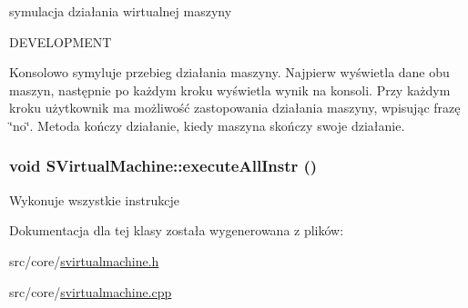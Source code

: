 symulacja działania wirtualnej maszyny 

DEVELOPMENT

Konsolowo symyluje przebieg działania maszyny. Najpierw wyświetla dane obu maszyn, następnie po każdym kroku wyświetla wynik na konsoli. Przy każdym kroku użytkownik ma możliwość zastopowania działania maszyny, wpisując frazę \char`\"{}no\char`\"{}. Metoda kończy działanie, kiedy maszyna skończy swoje działanie. \hypertarget{classSVirtualMachine_f3874f10dac15f27b23dc4b976271413}{
\subsubsection[{executeAllInstr}]{\setlength{\rightskip}{0pt plus 5cm}void SVirtualMachine::executeAllInstr ()}}
\label{classSVirtualMachine_f3874f10dac15f27b23dc4b976271413}


Wykonuje wszystkie instrukcje 

Dokumentacja dla tej klasy została wygenerowana z plików:\begin{CompactItemize}
\item 
src/core/\hyperlink{svirtualmachine_8h}{svirtualmachine.h}\item 
src/core/\hyperlink{svirtualmachine_8cpp}{svirtualmachine.cpp}\end{CompactItemize}
